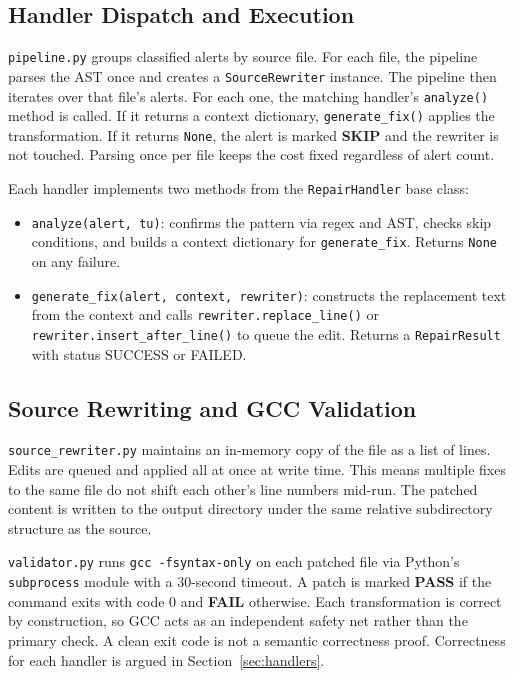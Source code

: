 \subsection{Handler Dispatch and Execution}

\texttt{pipeline.py} groups classified alerts by source file. For each file, the pipeline parses the AST once and creates a \texttt{SourceRewriter} instance. The pipeline then iterates over that file's alerts. For each one, the matching handler's \texttt{analyze()} method is called. If it returns a context dictionary, \texttt{generate\_fix()} applies the transformation. If it returns \texttt{None}, the alert is marked \textbf{SKIP} and the rewriter is not touched. Parsing once per file keeps the cost fixed regardless of alert count.

Each handler implements two methods from the \texttt{RepairHandler} base class:

\begin{itemize}
  \item \texttt{analyze(alert, tu)}: confirms the pattern via regex and AST, checks skip conditions, and builds a context dictionary for \texttt{generate\_fix}. Returns \texttt{None} on any failure.
  \item \texttt{generate\_fix(alert, context, rewriter)}: constructs the replacement text from the context and calls \texttt{rewriter.replace\_line()} or \texttt{rewriter.}\allowbreak\texttt{insert\_after\_line()} to queue the edit. Returns a \texttt{RepairResult} with status SUCCESS or FAILED.
\end{itemize}

\subsection{Source Rewriting and GCC Validation}

\texttt{source\_rewriter.py} maintains an in-memory copy of the file as a list of lines. Edits are queued and applied all at once at write time. This means multiple fixes to the same file do not shift each other's line numbers mid-run. The patched content is written to the output directory under the same relative subdirectory structure as the source.

\texttt{validator.py} runs \texttt{gcc -fsyntax-only} on each patched file via Python's \texttt{subprocess} module with a 30-second timeout. A patch is marked \textbf{PASS} if the command exits with code 0 and \textbf{FAIL} otherwise. Each transformation is correct by construction, so GCC acts as an independent safety net rather than the primary check. A clean exit code is not a semantic correctness proof. Correctness for each handler is argued in Section~\ref{sec:handlers}.

